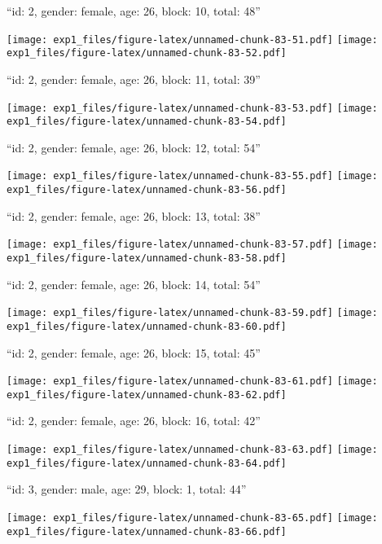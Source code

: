 \documentclass[11pt,,]{article}
\begin{document}
``id: 2, gender: female, age: 26, block: 10, total: 48''

\texttt{[image: exp1\_files/figure-latex/unnamed-chunk-83-51.pdf]}
\texttt{[image: exp1\_files/figure-latex/unnamed-chunk-83-52.pdf]}

\newpage
[1] 

``id: 2, gender: female, age: 26, block: 11, total: 39''

\texttt{[image: exp1\_files/figure-latex/unnamed-chunk-83-53.pdf]}
\texttt{[image: exp1\_files/figure-latex/unnamed-chunk-83-54.pdf]}

\newpage
[1] 

``id: 2, gender: female, age: 26, block: 12, total: 54''

\texttt{[image: exp1\_files/figure-latex/unnamed-chunk-83-55.pdf]}
\texttt{[image: exp1\_files/figure-latex/unnamed-chunk-83-56.pdf]}

\newpage
[1] 

``id: 2, gender: female, age: 26, block: 13, total: 38''

\texttt{[image: exp1\_files/figure-latex/unnamed-chunk-83-57.pdf]}
\texttt{[image: exp1\_files/figure-latex/unnamed-chunk-83-58.pdf]}

\newpage
[1] 

``id: 2, gender: female, age: 26, block: 14, total: 54''

\texttt{[image: exp1\_files/figure-latex/unnamed-chunk-83-59.pdf]}
\texttt{[image: exp1\_files/figure-latex/unnamed-chunk-83-60.pdf]}

\newpage
[1] 

``id: 2, gender: female, age: 26, block: 15, total: 45''

\texttt{[image: exp1\_files/figure-latex/unnamed-chunk-83-61.pdf]}
\texttt{[image: exp1\_files/figure-latex/unnamed-chunk-83-62.pdf]}

\newpage
[1] 

``id: 2, gender: female, age: 26, block: 16, total: 42''

\texttt{[image: exp1\_files/figure-latex/unnamed-chunk-83-63.pdf]}
\texttt{[image: exp1\_files/figure-latex/unnamed-chunk-83-64.pdf]}

\newpage
[1] 

``id: 3, gender: male, age: 29, block: 1, total: 44''

\texttt{[image: exp1\_files/figure-latex/unnamed-chunk-83-65.pdf]}
\texttt{[image: exp1\_files/figure-latex/unnamed-chunk-83-66.pdf]}

\newpage
[1] 
\end{document}
